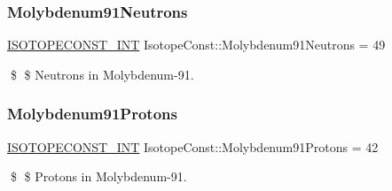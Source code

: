 \subsubsection{\texorpdfstring{Molybdenum91\+Neutrons}{Molybdenum91Neutrons}}
{\footnotesize\ttfamily \mbox{\hyperlink{group___isotope_const-_macros_ga5f18360b3e99483a35c32d789e62621c}{I\+S\+O\+T\+O\+P\+E\+C\+O\+N\+S\+T\+\_\+\+I\+NT}} Isotope\+Const\+::\+Molybdenum91\+Neutrons = 49}

\$ \$ Neutrons in Molybdenum-\/91. \mbox{\label{group___isotope_const-_molybdenum-_mo91_gaaa4704c1c6dfaf315bd4bdaf2c14371c}} 
\subsubsection{\texorpdfstring{Molybdenum91\+Protons}{Molybdenum91Protons}}
{\footnotesize\ttfamily \mbox{\hyperlink{group___isotope_const-_macros_ga5f18360b3e99483a35c32d789e62621c}{I\+S\+O\+T\+O\+P\+E\+C\+O\+N\+S\+T\+\_\+\+I\+NT}} Isotope\+Const\+::\+Molybdenum91\+Protons = 42}

\$ \$ Protons in Molybdenum-\/91. 